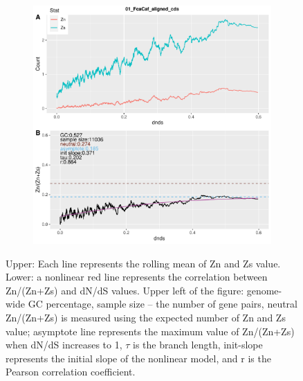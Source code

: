 \begin{figure}[H]
\begin{subfigure}[b]{0.5\textwidth}
     \includegraphics[page=9,width=1\linewidth,height=1.2\linewidth]{Figure/roll_ZnZs_max.pdf}
     \end{subfigure}
     { {Upper: Each line represents the rolling mean of Zn and Zs value. Lower: a nonlinear red line represents the correlation between Zn/(Zn+Zs) and dN/dS values. Upper left of the figure: genome-wide GC percentage, sample size -- the number of gene pairs, neutral Zn/(Zn+Zs) is measured using the expected number of Zn and Zs value; asymptote line represents the maximum value of Zn/(Zn+Zs) when dN/dS increases to 1, $\tau$ is the branch length, init-slope represents the initial slope of the nonlinear model, and r is the Pearson correlation coefficient.}
     \par}
\end{figure}
\newpage

